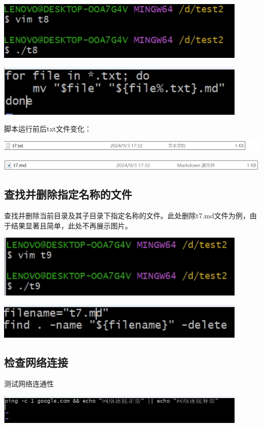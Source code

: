 \documentclass[UTF8,a4paper]{ctexart}
\begin{document}
\begin{sloppypar}
	\includegraphics[width = 12cm]{360}
	
	\includegraphics[width = 12cm]{36}
	
	脚本运行前后txt文件变化：
	
	\includegraphics[width = 16cm]{37}
	
	\includegraphics[width = 16cm]{38}
	
	\subsection{查找并删除指定名称的文件}
	查找并删除当前目录及其子目录下指定名称的文件。此处删除t7.md文件为例，由于结果显著且简单，此处不再展示图片。
	
	\includegraphics[width = 12cm]{39}
	
	\includegraphics[width = 12cm]{40}
	
	\subsection{检查网络连接}
	测试网络连通性
	
	\includegraphics[width = 12cm]{41}
	

\end{sloppypar}
\end{document}
